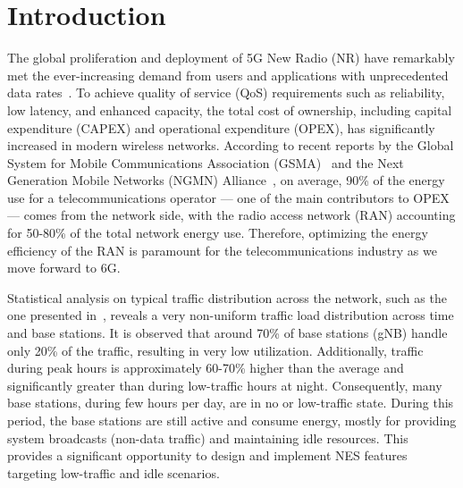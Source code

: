 \section{Introduction}

The global proliferation and deployment of 5G New Radio (NR) have remarkably met the ever-increasing demand from users and applications with unprecedented data rates~\cite{5G_survey}. To achieve quality of service (QoS) requirements such as reliability, low latency, and enhanced capacity, the total cost of ownership, including capital expenditure (CAPEX) and operational expenditure (OPEX), has significantly increased in modern wireless networks.
According to recent reports by the Global System for Mobile Communications Association (GSMA)~\cite{gsma_report} and the Next Generation Mobile Networks (NGMN) Alliance~\cite{9349624}, on average, 90\% of the energy use for a telecommunications operator — one of the main contributors to OPEX — comes from the network side, with the radio access network (RAN) accounting for 50-80\% of the total network energy use. Therefore, optimizing the energy efficiency of the RAN is paramount for the telecommunications industry as we move forward to 6G. 

{Statistical analysis on typical traffic distribution across the network, such as the one presented in~\cite{nokia_report}, reveals a very non-uniform traffic load distribution across time and base stations.}
It is observed that around 70\% of base stations (gNB) handle only 20\% of the traffic, resulting in very low utilization. Additionally, traffic during peak hours is approximately 60-70\% higher than the average and significantly greater than during low-traffic hours at night. {Consequently, many base stations, during few hours per day, are in no or low-traffic state. During this period, the base stations are still active and consume energy, mostly for providing system broadcasts (non-data traffic) and maintaining idle resources.}
This provides a significant opportunity to design and implement NES features targeting low-traffic and idle scenarios.

